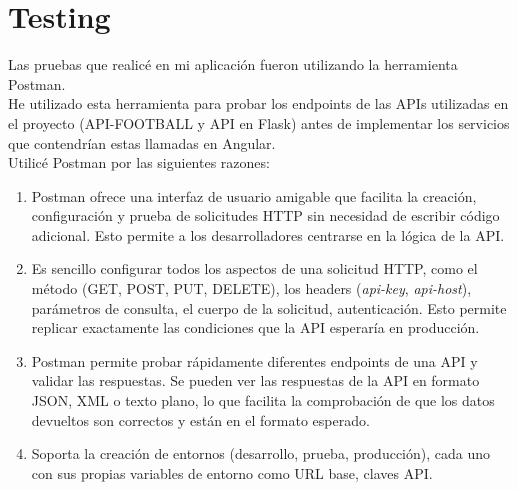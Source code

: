 \section{Testing}
Las pruebas que realicé en mi aplicación fueron utilizando la herramienta Postman. \\
He utilizado esta herramienta para probar los endpoints de las APIs utilizadas en el proyecto (API-FOOTBALL y API en Flask) antes de implementar los servicios que contendrían estas llamadas en Angular. \\
Utilicé Postman por las siguientes razones:
\begin{enumerate}
    \item Postman ofrece una interfaz de usuario amigable que facilita la creación, configuración y prueba de solicitudes HTTP sin necesidad de escribir código adicional. Esto permite a los desarrolladores centrarse en la lógica de la API.
    \item Es sencillo configurar todos los aspectos de una solicitud HTTP, como el método (GET, POST, PUT, DELETE), los headers (\textit{api-key}, \textit{api-host}), parámetros de consulta, el cuerpo de la solicitud, autenticación. Esto permite replicar exactamente las condiciones que la API esperaría en producción.
    \item Postman permite probar rápidamente diferentes endpoints de una API y validar las respuestas. Se pueden ver las respuestas de la API en formato JSON, XML o texto plano, lo que facilita la comprobación de que los datos devueltos son correctos y están en el formato esperado.
    \item Soporta la creación de entornos (desarrollo, prueba, producción), cada uno con sus propias variables de entorno como URL base, claves API.
\end{enumerate}


